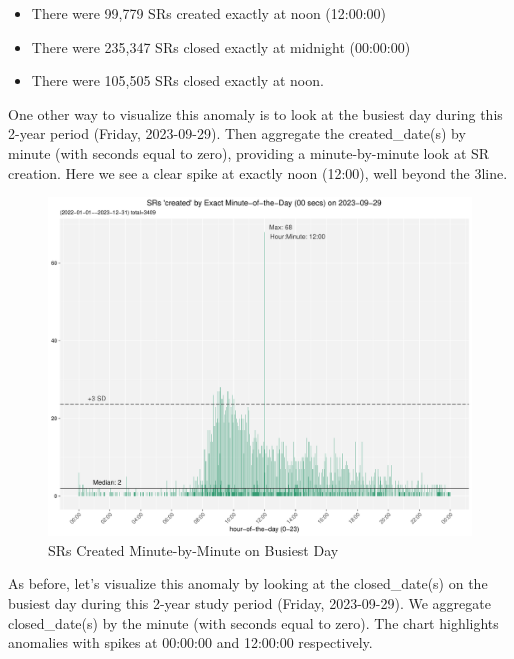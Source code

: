 \documentclass[12pt, titlepage]{article}
\begin{document}
\begin{itemize}
	 \item There were 99,779 SRs created exactly at noon (12:00:00)
	 \item There were 235,347 SRs closed exactly at midnight (00:00:00)
	\item There were 105,505 SRs closed exactly at noon. 
\end{itemize}

One other way to visualize this anomaly is to look at the busiest day 
during this 2-year period (Friday, 2023-09-29). Then aggregate 
the created\_date(s) by minute (with seconds equal to zero), providing
a minute-by-minute look at SR creation. Here we see a clear 
spike at exactly noon (12:00), well beyond the 3\textsigma line.

\begin{figure}[tbp]
	\centering
	\includegraphics[width=\textwidth]
	{2-year-trend-SR_created_by_minute_of_busiest_day.pdf}
	\caption{SRs Created Minute-by-Minute on Busiest Day}
	\label{fig:busiestcreated}
\end{figure}	

As before, let's visualize this anomaly by looking at the closed\_date(s) 
on the busiest day during this 2-year study period (Friday, 2023-09-29). 
We aggregate closed\_date(s) by the minute (with seconds equal to zero). 
The chart highlights anomalies with spikes at 00:00:00 and 
12:00:00 respectively. 
\end{document}
